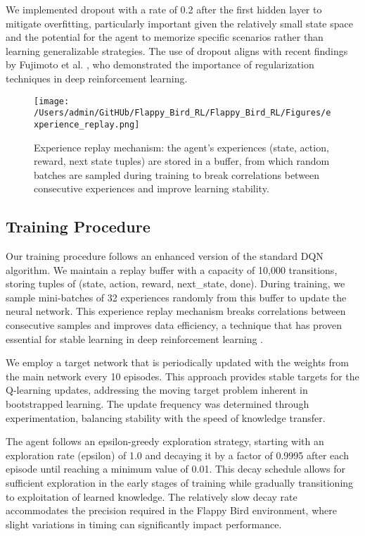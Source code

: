 We implemented dropout with a rate of 0.2 after the first hidden layer to mitigate overfitting, particularly important given the relatively small state space and the potential for the agent to memorize specific scenarios rather than learning generalizable strategies. The use of dropout aligns with recent findings by Fujimoto et al. \cite{fujimoto2021minimalist}, who demonstrated the importance of regularization techniques in deep reinforcement learning.

\begin{figure}[!t]
\centering
\texttt{[image: /Users/admin/GitHUb/Flappy\_Bird\_RL/Flappy\_Bird\_RL/Figures/experience\_replay.png]}
\caption{Experience replay mechanism: the agent's experiences (state, action, reward, next state tuples) are stored in a buffer, from which random batches are sampled during training to break correlations between consecutive experiences and improve learning stability.}
\label{fig:experience_replay}
\end{figure}

\subsection{Training Procedure}

Our training procedure follows an enhanced version of the standard DQN algorithm. We maintain a replay buffer with a capacity of 10,000 transitions, storing tuples of (state, action, reward, next\_state, done). During training, we sample mini-batches of 32 experiences randomly from this buffer to update the neural network. This experience replay mechanism breaks correlations between consecutive samples and improves data efficiency, a technique that has proven essential for stable learning in deep reinforcement learning \cite{wang2022offline}.

We employ a target network that is periodically updated with the weights from the main network every 10 episodes. This approach provides stable targets for the Q-learning updates, addressing the moving target problem inherent in bootstrapped learning. The update frequency was determined through experimentation, balancing stability with the speed of knowledge transfer.

The agent follows an epsilon-greedy exploration strategy, starting with an exploration rate (epsilon) of 1.0 and decaying it by a factor of 0.9995 after each episode until reaching a minimum value of 0.01. This decay schedule allows for sufficient exploration in the early stages of training while gradually transitioning to exploitation of learned knowledge. The relatively slow decay rate accommodates the precision required in the Flappy Bird environment, where slight variations in timing can significantly impact performance.

